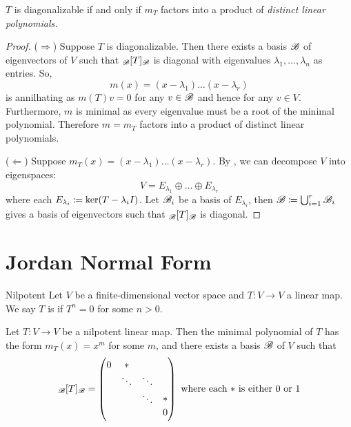 \documentclass{styles/tufte}
\begin{document}
  \begin{theorem}{}{}
    $T$ is diagonalizable if and only if $m_T$ factors into a product of \em{distinct} linear polynomials.
  \end{theorem}
  \begin{proof}
    ($\Rightarrow$) Suppose $T$ is diagonalizable. Then there exists a basis $\mathscr{B}$ of eigenvectors of $V$ such that ${}_{\mathscr{B}}[T]_{\mathscr{B}}$ is diagonal with eigenvalues $\lambda_1, \dots, \lambda_n$ as entries. So,
    \[ m(x) = (x - \lambda_1) \dots (x - \lambda_r) \]
    is annilhating as $m(T)v = 0$ for any $v \in \mathscr{B}$ and hence for any $v \in V$. Furthermore, $m$ is minimal as every eigenvalue must be a root of the minimal polynomial. Therefore $m = m_T$ factors into a product of distinct linear polynomials.
    
    ($\Leftarrow$) Suppose $m_T(x) = (x - \lambda_1) \dots (x - \lambda_r)$. By , we can decompose $V$ into eigenspaces:
    \[ V = E_{\lambda_1} \oplus \dots \oplus E_{\lambda_r} \]
    where each $E_{\lambda_i} \coloneqq \ker(T - \lambda_i I)$. Let $\mathscr{B}_i$ be a basis of $E_{\lambda_i}$, then $\mathscr{B} \coloneqq \bigcup_{i=1}^r \mathscr{B}_i$ gives a basis of eigenvectors such that ${}_{\mathscr{B}}[T]_{\mathscr{B}}$ is diagonal.
  \end{proof}



\section{Jordan Normal Form}

\begin{definition}{Nilpotent}{}
  Let $V$ be a finite-dimensional vector space and $T: V \to V$ a linear map. We say $T$ is  if $T^n = 0$ for some $n > 0$.
\end{definition}

\begin{theorem}{}{}
  Let $T: V \to V$ be a nilpotent linear map. Then the minimal polynomial of $T$ has the form $m_T(x) = x^m$ for some $m$, and there exists a basis $\mathscr{B}$ of $V$ such that
  \[ \changeofbasis{\BB}{T}{\BB} = \begin{pmatrix}
    0 & * & & \\
    & \ddots & \ddots & \\
    & & \ddots & \raisebox{0.25em}{$*$} \\
    & & & 0
  \end{pmatrix} \text{ where each $*$ is either $0$ or $1$} \]
\end{theorem}
\end{document}
